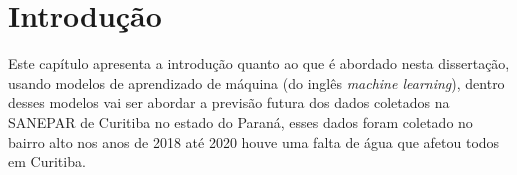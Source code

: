 

\section{Introdu{\c c}{\~a}o} \label{sec:int}

Este capítulo apresenta a introdução quanto ao que é abordado nesta dissertação, usando modelos de aprendizado de máquina (do inglês \textit{machine learning}), dentro desses modelos vai ser abordar a previsão futura dos dados coletados na SANEPAR de Curitiba no estado do Paraná, esses dados foram coletado no bairro alto nos anos de 2018 até 2020 houve uma falta de água que afetou todos em Curitiba.




    
          
    
    
    
    
    
    
    
    